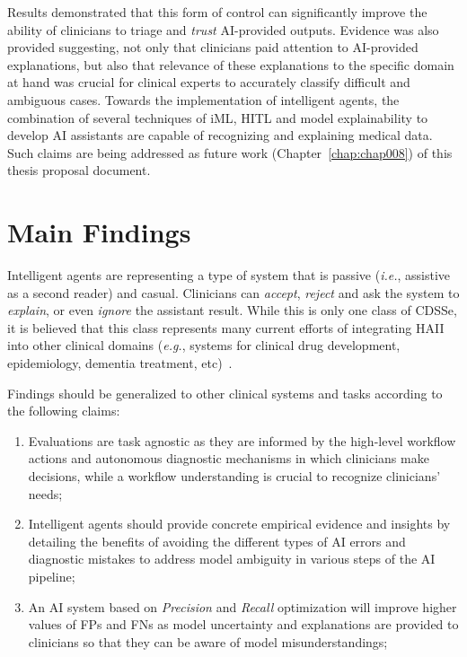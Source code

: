 Results demonstrated that this form of control can significantly improve the ability of clinicians to triage and {\it trust} \ac{AI}-provided outputs.
Evidence was also provided suggesting, not only that clinicians paid attention to \ac{AI}-provided explanations, but also that relevance of these explanations to the specific domain at hand was crucial for clinical experts to accurately classify difficult and ambiguous cases.
Towards the implementation of intelligent agents, the combination of several techniques of \ac{iML}, \ac{HITL} and model explainability to develop \ac{AI} assistants are capable of recognizing and explaining medical data.
Such claims are being addressed as future work (Chapter~\ref{chap:chap008}) of this thesis proposal document.

\section{Main Findings}
\label{sec:chap007003}

Intelligent agents are representing a type of system that is passive ({\it i.e.}, assistive as a second reader) and casual.
Clinicians can {\it accept}, {\it reject} and ask the system to {\it explain}, or even {\it ignore} the assistant result.
While this is only one class of \ac{CDSSe}, it is believed that this class represents many current efforts of integrating \ac{HAII} into other clinical domains ({\it e.g.}, systems for clinical drug development, epidemiology, dementia treatment, etc)~\cite{Savage2019, shah2019artificial, topol2019high}.

\hfill

\noindent
Findings should be generalized to other clinical systems and tasks according to the following claims:

\begin{enumerate}
\item Evaluations are task agnostic as they are informed by the high-level workflow actions and autonomous diagnostic mechanisms in which clinicians make decisions, while a workflow understanding is crucial to recognize clinicians' needs;
\item Intelligent agents should provide concrete empirical evidence and insights by detailing the benefits of avoiding the different types of \ac{AI} errors and diagnostic mistakes to address model ambiguity in various steps of the \ac{AI} pipeline;
\item An \ac{AI} system based on {\it Precision} and {\it Recall} optimization will improve higher values of \acp{FP} and \acp{FN} as model uncertainty and explanations are provided to clinicians so that they can be aware of model misunderstandings;
\end{enumerate}

